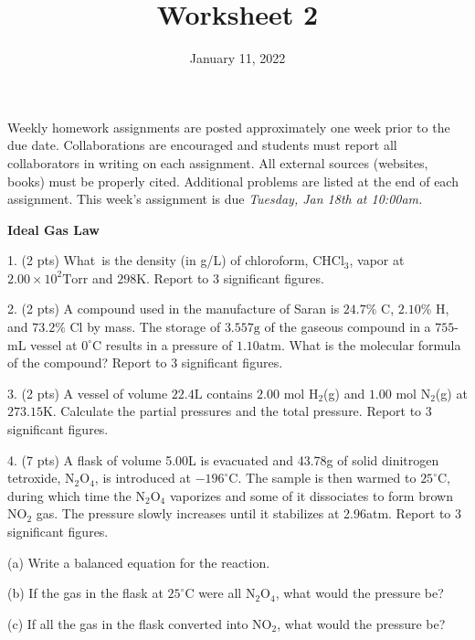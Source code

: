 \documentclass[11pt]{article}
\title{\textbf{Worksheet 2}}
\date{\vspace{-2em}January 11, 2022}
\begin{document}
\maketitle

Weekly homework assignments are posted approximately one week prior to the
due date. Collaborations are encouraged and students must report all collaborators
in writing on each assignment. All external sources (websites, books) must be
properly cited. Additional problems are listed at the end of each assignment.
This week's assignment is due \textit{Tuesday, Jan 18th at 10:00am.}

\textbf{Ideal Gas Law}

1. (2 pts) What\ is the density (in g/L) of chloroform, CHCl$_3$, vapor at
$2.00\times 10^2\text{Torr}$ and $298\text{K}$. Report to 3 significant figures.

\vspace{1.5in}

2. (2 pts) A compound used in the manufacture of Saran is $24.7\%$ C, $2.10\%$ H, and
$73.2\%$ Cl by mass. The storage of $3.557\text{g}$ of the gaseous compound in
a $755$-mL vessel at $0^\circ\text{C}$ results in a pressure of $1.10\text{atm}$.
What is the molecular formula of the compound? Report to 3 significant figures.


\vspace{1.5in}

3. (2 pts) A vessel of volume $22.4\text{L}$ contains $2.00$ mol H$_2$(g) and $1.00$ mol
N$_2$(g) at $273.15\text{K}$. Calculate the partial pressures and the total pressure.
Report to 3 significant figures.

\vspace{1.7in}

4. (7 pts) A flask of volume 5.00L is evacuated and 43.78g of solid dinitrogen tetroxide,
N$_2$O$_4$, is introduced at $-196^\circ\text{C}$. The sample is then warmed to
$25^\circ\text{C}$, during which time the N$_2$O$_4$ vaporizes and some of it dissociates
to form brown NO$_2$ gas. The pressure slowly increases until it stabilizes at 2.96atm.
Report to 3 significant figures.

(a) Write a balanced equation for the reaction.

(b) If the gas in the flask at $25^\circ\text{C}$ were all N$_2$O$_4$, what would the pressure
be?

(c) If all the gas in the flask converted into NO$_2$, what would the pressure be?
\end{document}
